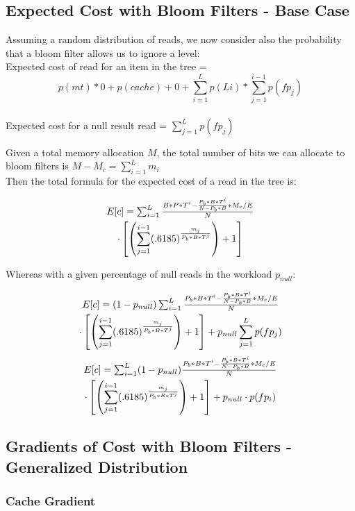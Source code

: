 \documentclass{cidr-2019}
\begin{document}
\subsection{Expected Cost with Bloom Filters - Base Case}

Assuming a random distribution of reads, we now consider also the probability that a bloom filter allows us to ignore a level: \\
Expected cost of read for an item in the tree = $$p(mt) * 0  + p(cache) + 0 + \sum_{i=1}^L p(Li) * \sum_{j=1}^{i-1} p(fp_j)$$ \\
Expected cost for a null result read = $\sum_{j=1}^{L} p(fp_j)$

Given a total memory allocation $M$, the total number of bits we can allocate
to bloom filters is $M-M_c = \sum_{i=1}^L m_i$ \\ Then the total formula for
the expected cost of a read in the tree is: 

\begin{multline}
$$E[c] = \sum_{i=1}^{L} \frac{B*P*T^i - \frac{P_b*B*T^i}{N-P_b*B} * M_c/E}{N} \\ \cdot \left[ \left(\sum_{j=1}^{i-1} (.6185) ^  {\frac{m_j}{P_b*B*T^j}}\right) +1 \right]$$ 
\end{multline}

Whereas with a given percentage of null reads in the workload $p_{null}$:

\begin{multline}
$$E[c] = (1-p_{null})\sum_{i=1}^{L} \frac{P_b*B*T^i - \frac{P_b*B*T^i}{N-P_b*B} * M_c/E}{N} \\ \cdot \left[ \left(\sum_{j=1}^{i-1} (.6185) ^  {\frac{m_j}{P_b*B*T^j}}\right) +1 \right] + p_{null}\sum_{j=1}^{L} p(fp_j)$$
\end{multline}
\begin{multline}
$$E[c] = \sum_{i=1}^{L} (1-p_{null})\frac{P_b*B*T^i - \frac{P_b*B*T^i}{N-P_b*B} * M_c/E}{N} \\ \cdot \left[ \left(\sum_{j=1}^{i-1} (.6185) ^  {\frac{m_j}{P_b*B*T^j}}\right) +1 \right] + p_{null} \cdot p(fp_i) $$
\end{multline}

\subsection{Gradients of Cost with Bloom Filters - Generalized Distribution}

\subsubsection{Cache Gradient}
\end{document}

